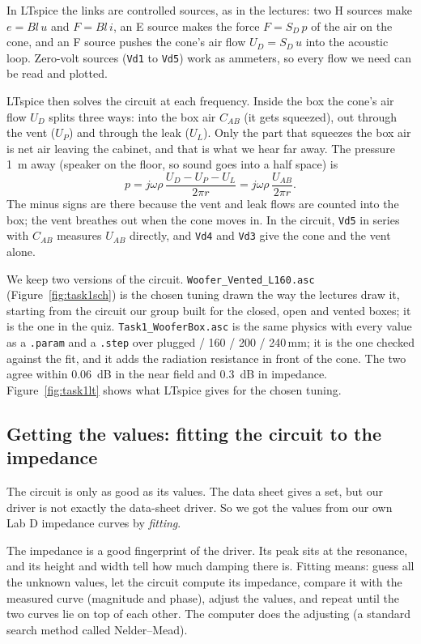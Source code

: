 \documentclass[a4paper,10pt]{article}
\newcommand{\file}[1]{\nolinkurl{#1}}
\begin{document}
In LTspice the links are controlled sources, as in the lectures: two H sources make $e = Bl\,u$ and
$F = Bl\,i$, an E source makes the force $F = S_D\,p$ of the air on the cone, and an F source pushes
the cone's air flow $U_D = S_D\,u$ into the acoustic loop. Zero-volt sources (\file{Vd1} to \file{Vd5})
work as ammeters, so every flow we need can be read and plotted.

LTspice then solves the circuit at each frequency. Inside the box the cone's air flow $U_D$ splits
three ways: into the box air $C_{AB}$ (it gets squeezed), out through the vent ($U_P$) and through
the leak ($U_L$). Only the part that squeezes the box air is net air leaving the cabinet, and that is
what we hear far away. The pressure \SI{1}{m} away (speaker on the floor, so sound goes into a half
space) is
\[ p = j\omega\rho\,\frac{U_D - U_P - U_L}{2\pi r} = j\omega\rho\,\frac{U_{AB}}{2\pi r}. \]
The minus signs are there because the vent and leak flows are counted into the box; the vent breathes
out when the cone moves in. In the circuit, \file{Vd5} in series with $C_{AB}$ measures $U_{AB}$ directly,
and \file{Vd4} and \file{Vd3} give the cone and the vent alone.

We keep two versions of the circuit. \file{Woofer_Vented_L160.asc} (Figure~\ref{fig:task1sch}) is the
chosen tuning drawn the way the lectures draw it, starting from the circuit our group built for the
closed, open and vented boxes; it is the one in the quiz. \file{Task1_WooferBox.asc} is the same physics
with every value as a \file{.param} and a \file{.step} over plugged / 160 / 200 / 240\,mm; it is the
one checked against the fit, and it adds the radiation resistance in front of the cone. The two agree
within \SI{0.06}{dB} in the near field and \SI{0.3}{dB} in impedance. Figure~\ref{fig:task1lt} shows
what LTspice gives for the chosen tuning.

\subsection{Getting the values: fitting the circuit to the impedance}
The circuit is only as good as its values. The data sheet gives a set, but our driver is not exactly
the data-sheet driver. So we got the values from our own Lab D impedance curves by \emph{fitting}.

The impedance is a good fingerprint of the driver. Its peak sits at the resonance, and its height and
width tell how much damping there is. Fitting means: guess all the unknown values, let the circuit
compute its impedance, compare it with the measured curve (magnitude and phase), adjust the values,
and repeat until the two curves lie on top of each other. The computer does the adjusting (a
standard search method called Nelder--Mead).
\end{document}
